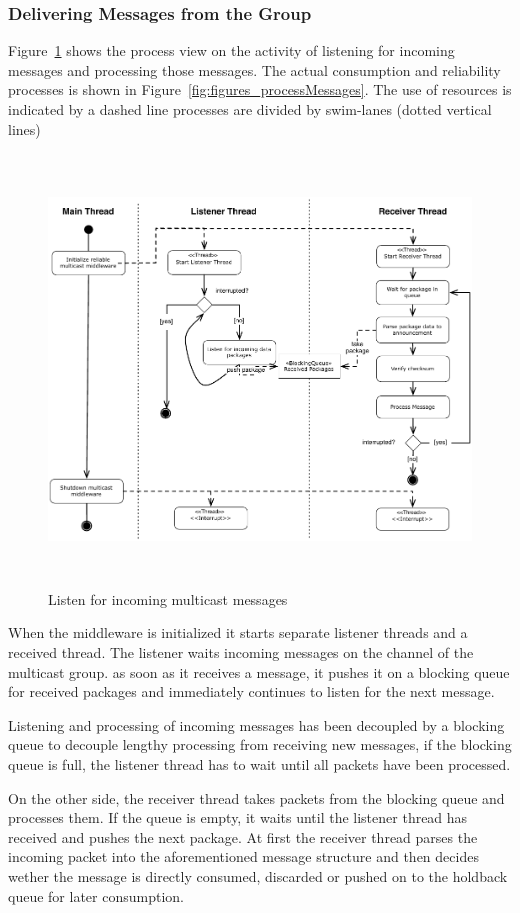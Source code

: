 \subsubsection{Delivering Messages from the Group}
Figure~\ref{fig:figures_processReceivePackage} shows the process view on the activity of listening for incoming messages and processing those messages. The actual consumption and reliability processes is shown in Figure~\ref{fig:figures_processMessages}.
The use of resources  is indicated by a dashed line 
processes are divided by swim-lanes (dotted vertical lines)
\begin{figure}[htbp]
    \centering
        \includegraphics[height=4.5in]{figures/receivePackets.pdf}
    \caption{Listen for incoming multicast messages}
    \label{fig:figures_processReceivePackage}
\end{figure}
When the middleware is initialized it starts separate listener threads and a received thread. The listener waits incoming messages on the channel of the multicast group. as soon as it receives a message, it pushes it on a blocking queue for received packages and immediately continues to listen for the next message. 

Listening and processing of incoming messages has been decoupled by a blocking queue to decouple lengthy processing from receiving new messages, if the blocking queue is full, the listener thread has to wait until all packets have been processed. 

On the other side, the receiver thread takes packets from the blocking queue and processes them. If the queue is empty,  it waits until the listener thread has received and pushes the next package. 
At first the receiver thread parses the incoming packet into the aforementioned message structure and then decides wether the message is directly consumed, discarded or pushed on to the holdback queue for later consumption.

